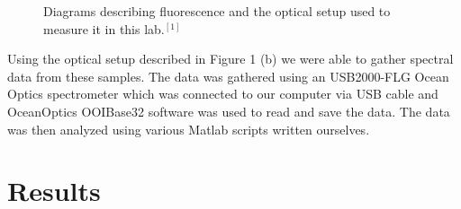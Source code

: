 \documentclass{article}
\begin{document}
\begin{figure}%
   \centering
    \qquad
    \caption{Diagrams describing fluorescence and the optical setup used to measure it in this lab.$^{[1]}$}%
    \label{fig:example}%
\end{figure}

Using the optical setup described in Figure 1 (b) we were able to gather spectral data from these samples.  The data was gathered using an USB2000-FLG Ocean Optics spectrometer which was connected to our computer via USB cable and OceanOptics OOIBase32 software was used to read and save the data.  The data was then analyzed using various Matlab scripts written ourselves. 

\section{Results}
\end{document}

